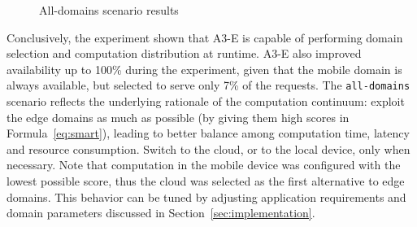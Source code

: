 \begin{figure}[htb]
\centering
	\captionsetup[subfigure]{width=0.32\textwidth}
	\captionsetup[subfigure]{width=0.32\textwidth}
	\captionsetup[subfigure]{width=0.32\textwidth}
	
	\caption{All-domains scenario results} \label{fig:all-domains}
\end{figure}

Conclusively, the experiment shown that A3-E is capable of performing domain selection and computation distribution at runtime. A3-E also improved availability up to 100\% during the experiment, given that the mobile domain is always available, but selected to serve only 7\% of the requests.
The \texttt{all-domains} scenario reflects the underlying rationale of the computation continuum: exploit the edge domains as much as possible (by giving them high scores in Formula~\ref{eq:smart}), leading to better balance among computation time, latency and resource consumption. Switch to the cloud, or to the local device, only when necessary. Note that computation in the mobile device was configured with the lowest possible score, thus the cloud was selected as the first alternative to edge domains. This behavior can be tuned by adjusting application requirements and domain parameters discussed in Section~\ref{sec:implementation}.

